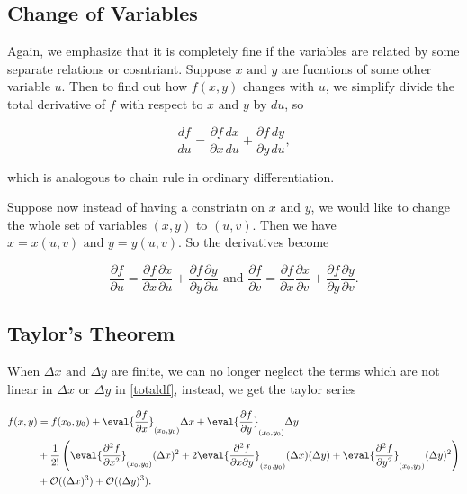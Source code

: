 \documentclass[english,a4paper,12pt]{report}
\begin{document}
\subsection{Change of Variables}

Again, we emphasize that it is completely fine if the variables are related by some separate relations or cosntriant. Suppose \(x \text { and } y\) are fucntions of some other variable \(u\). Then to find out how \(f(x,y)\) changes with \(u\), we simplify divide the total derivative of \(f\) with respect to \(x \text { and } y\) by \(du\), so

\begin{equation}
    \frac{df}{du} = \frac{\partial f}{\partial x} \frac{dx}{du} + \frac{\partial f}{\partial y} \frac{dy}{du},
\end{equation}

which is analogous to chain rule in ordinary differentiation.

Suppose now instead of having a constriatn on \(x\text { and } y\), we would like to change the whole set of variables \((x,y)\) to \((u,v)\). Then we have \(x = x(u,v) \text { and } y = y(u,v)\). So the derivatives become

\begin{equation}
    \frac{\partial f}{\partial u} = \frac{\partial f}{\partial x} \frac{\partial x}{\partial u} + \frac{\partial f}{\partial y} \frac{\partial y}{\partial u} \text { and } \frac{\partial f}{\partial v} = \frac{\partial f}{\partial x} \frac{\partial x}{\partial v} + \frac{\partial f}{\partial y} \frac{\partial y}{\partial v}.  
\end{equation}



\subsection{Taylor's Theorem}
When \(\Delta x \text { and }  \Delta y\) are finite, we can no longer neglect the terms which are not linear in \(\Delta x \text { or } \Delta y\) in \cref{totaldf}, instead, we get the taylor series 

\begin{equation}
    \begin{aligned}
    f(x,y) &= f(x_0 ,y_0 ) + \eval{\frac{\partial f}{\partial x}}_{(x_0 ,y_0 )}  \Delta x + \eval{\frac{\partial f}{\partial y}}_{(x_0 ,y_0 )} \Delta y \\ &+ \frac{1}{2!} \left( \eval{\frac{\partial^2 f}{\partial x^2}}_{(x_0 ,y_0 )}  (\Delta x)^2 + 2\eval{\frac{\partial^2 f}{\partial x \partial y}}_{(x_0 ,y_0 )}(\Delta x)(\Delta y) + \eval{\frac{\partial^2 f}{\partial y^2}}_{(x_0 ,y_0 )} (\Delta y)^2 \right) \\ &+ \mathcal{O}((\Delta x)^3 ) + \mathcal{O}((\Delta y)^3 ).        
    \end{aligned}
\end{equation}
\end{document}
